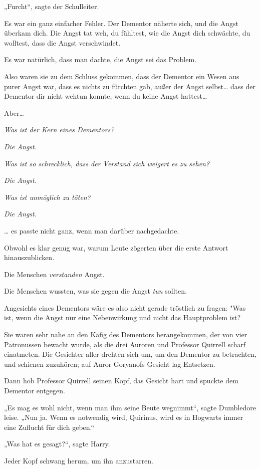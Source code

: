 {„Furcht“, sagte der Schulleiter.

Es war ein ganz einfacher Fehler. Der Dementor näherte sich, und die Angst überkam dich. Die Angst tat weh, du fühltest, wie die Angst dich schwächte, du wolltest, dass die Angst verschwindet.

Es war natürlich, dass man dachte, die Angst sei das Problem.

Also waren sie zu dem Schluss gekommen, dass der Dementor ein Wesen aus purer Angst war, dass es nichts zu fürchten gab, außer der Angst selbst… dass der Dementor dir nicht wehtun konnte, wenn du keine Angst hattest…

Aber…

\emph{Was ist der Kern eines Dementors?}

\emph{Die Angst.}

\emph{Was ist so schrecklich, dass der Verstand sich weigert es zu sehen?}

\emph{Die Angst.}

\emph{Was ist unmöglich zu töten?}

\emph{Die Angst.}

… es passte nicht ganz, wenn man darüber nachgedachte.

Obwohl es klar genug war, warum Leute zögerten über die erste Antwort hinauszublicken.

Die Menschen \emph{verstanden} Angst.

Die Menschen wussten, was sie gegen die Angst \emph{tun} sollten.

Angesichts eines Dementors wäre es also nicht gerade tröstlich zu fragen: "Was ist, wenn die Angst nur eine Nebenwirkung und nicht das Hauptproblem ist?

Sie waren sehr nahe an den Käfig des Dementors herangekommen, der von vier Patronussen bewacht wurde, als die drei Auroren und Professor Quirrell scharf einatmeten. Die Gesichter aller drehten sich um, um den Dementor zu betrachten, und schienen zuzuhören; auf Auror Goryanofs Gesicht lag Entsetzen.

Dann hob Professor Quirrell seinen Kopf, das Gesicht hart und spuckte dem Dementor entgegen.

„Es mag es wohl nicht, wenn man ihm seine Beute wegnimmt“, sagte Dumbledore leise. „Nun ja. Wenn es notwendig wird, Quirinus, wird es in Hogwarts immer eine Zuflucht für dich geben.“

„Was hat es gesagt?“, sagte Harry.

Jeder Kopf schwang herum, um ihn anzustarren.

}
